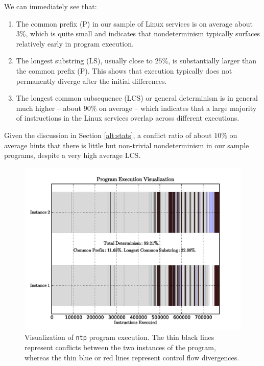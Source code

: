 \newpage 
We can immediately see that:
\begin{enumerate}
\item The common prefix (P) 
in our sample of Linux services is on average about $3\%$,
which is quite small and indicates that nondeterminism 
typically surfaces relatively early in program execution. 

\item The longest substring (LS), usually close to $25\%$,
is substantially larger than the common prefix (P).
This shows that execution typically does not permanently
diverge after the initial differences.

\item The longest common subsequence (LCS) or general determinism
is in general much higher -- about $90\%$ on average -- 
which indicates that a large majority of instructions 
in the Linux services overlap across
different executions. 
\end{enumerate}

\noindent Given the discussion in Section \ref{alt:stats}, a conflict ratio
of about $10\%$ on average hints that there is little but non-trivial nondeterminism 
in our sample programs, despite a very high average LCS.

\begin{figure}
  \center
  \includegraphics[trim=4cm 0cm 0cm 0cm, width=1.1\textwidth]{ntp-ch2.png}
  \caption[Visualization of \texttt{ntp} program execution]%
          {Visualization of \texttt{ntp} program execution.
          The thin black lines represent conflicts between
          the two instances of the program, whereas
          the thin blue or red lines represent control flow
          divergences.}
  \label{ntp:tracech2}
\end{figure} 


